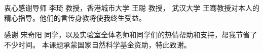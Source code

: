 \begin{acknowledgement}

  衷心感谢导师 李琦 教授，香港城市大学 王聪 教授， 武汉大学 王骞教授对本人的精心指导。他们的言传身教将使我终生受益。

  感谢 宋奇阳 同学，以及实验室全体老师和同学们的热情帮助和支持，帮我节省了不少时间。
  本课题承蒙国家自然科学基金资助，特此致谢。

\end{acknowledgement}
